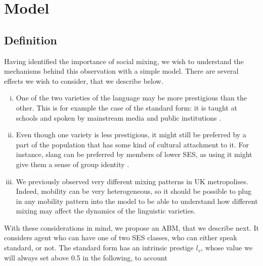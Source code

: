 \documentclass[../thesis.tex]{subfiles}
\begin{document}
\section{Model}

\subsection{Definition}
Having identified the importance of social mixing, we wish to understand the mechanisms
behind this observation with a simple model.
There are several effects we wish to
consider, that we describe below.
\begin{enumerate}[(i)]
  \item One of the two varieties of the language may be more prestigious than the other.
  This is for example the case of the standard form: it is taught at schools and spoken
  by mainstream media and public institutions \cite{DavilaInevitabilityStandard2016}.
  \item Even though one variety is less prestigious, it might still be preferred by a
  part of the population that has some kind of cultural attachment to it. For instance,
  slang can be preferred by members of lower \ac{SES}, as using it might give them a
  sense of group identity
  \cite{LabovSocialStratification1966,TrudgillSocialDifferentiation1974}.
  \item We previously observed very different mixing patterns in UK metropolises.
  Indeed, mobility can be very heterogeneous, so it should be possible to plug in any
  mobility pattern into the model to be able to understand how different mixing may
  affect the dynamics of the linguistic varieties.
\end{enumerate}
With these considerations in mind, we propose an \ac{ABM}, that we describe next. It
considers agent who can have one of two \ac{SES} classes,
who can either speak standard, or not. The standard form has an intrinsic
prestige $l_v$, whose value we will always set above 0.5 in the following, to account
\end{document}
